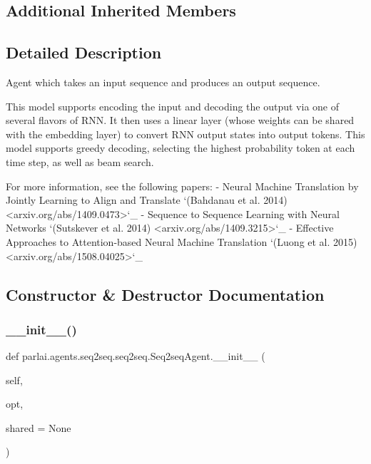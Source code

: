 \subsection*{Additional Inherited Members}


\subsection{Detailed Description}
\begin{DoxyVerb}Agent which takes an input sequence and produces an output sequence.

This model supports encoding the input and decoding the output via one of
several flavors of RNN. It then uses a linear layer (whose weights can
be shared with the embedding layer) to convert RNN output states into
output tokens. This model supports greedy decoding, selecting the
highest probability token at each time step, as well as beam
search.

For more information, see the following papers:
- Neural Machine Translation by Jointly Learning to Align and Translate
  `(Bahdanau et al. 2014) <arxiv.org/abs/1409.0473>`_
- Sequence to Sequence Learning with Neural Networks
  `(Sutskever et al. 2014) <arxiv.org/abs/1409.3215>`_
- Effective Approaches to Attention-based Neural Machine Translation
  `(Luong et al. 2015) <arxiv.org/abs/1508.04025>`_
\end{DoxyVerb}
 

\subsection{Constructor \& Destructor Documentation}
\mbox{\label{classparlai_1_1agents_1_1seq2seq_1_1seq2seq_1_1Seq2seqAgent_a7d1af2d90ac02cd2c7401185c2d09c3e}} 
\subsubsection{\texorpdfstring{\+\_\+\+\_\+init\+\_\+\+\_\+()}{\_\_init\_\_()}}
{\footnotesize\ttfamily def parlai.\+agents.\+seq2seq.\+seq2seq.\+Seq2seq\+Agent.\+\_\+\+\_\+init\+\_\+\+\_\+ (\begin{DoxyParamCaption}\item[{}]{self,  }\item[{}]{opt,  }\item[{}]{shared = {\ttfamily None} }\end{DoxyParamCaption})}


